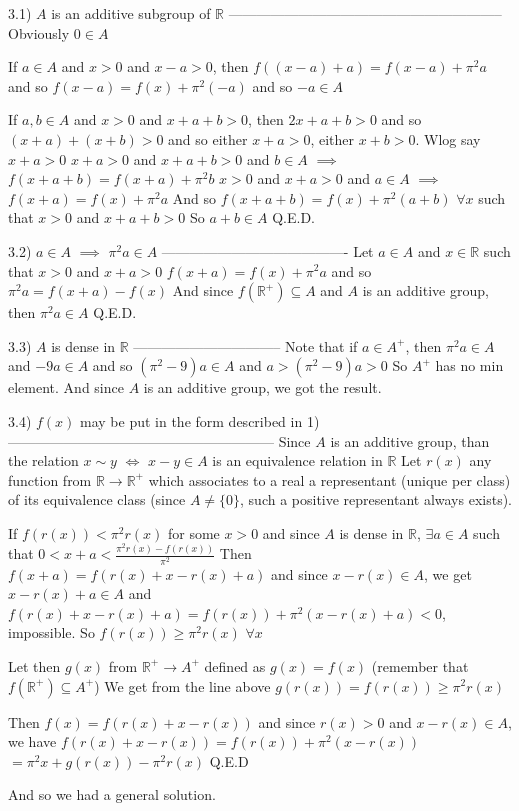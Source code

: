 \begin{solution}
3.1) $A$ is an additive subgroup of $\mathbb R$
-----------------------------------------------------------
Obviously $0\in A$

If $a\in A$ and $x>0$ and $x-a>0$, then $f((x-a)+a)=f(x-a)+\pi^2a$ and so $f(x-a)=f(x)+\pi^2(-a)$ and so $-a\in A$

If $a,b\in A$ and $x>0$ and $x+a+b>0$, then $2x+a+b>0$ and so $(x+a)+(x+b)>0$ and so either $x+a>0$, either $x+b>0$. Wlog say $x+a>0$
$x+a>0$ and $x+a+b>0$ and $b\in A$ $\implies$ $f(x+a+b)=f(x+a)+\pi^2b$
$x>0$ and $x+a>0$ and $a\in A$ $\implies$ $f(x+a)=f(x)+\pi^2a$
And so $f(x+a+b)=f(x)+\pi^2(a+b)$ $\forall x$ such that $x>0$ and $x+a+b>0$
So $a+b\in A$
Q.E.D.

3.2) $a\in A$ $\implies$ $\pi^2a\in A$
----------------------------------------
Let $a\in A$ and $x\in\mathbb R$ such that $x>0$ and $x+a>0$
$f(x+a)=f(x)+\pi^2a$ and so $\pi^2a=f(x+a)-f(x)$
And since $f(\mathbb R^+)\subseteq A$ and $A$ is an additive group, then  $\pi^2a\in A$
Q.E.D.

3.3) $A$ is dense in $\mathbb R$
--------------------------------
Note that if $a\in A^+$, then $\pi^2a\in A$ and $-9a\in A$ and so $(\pi^2-9)a\in A$ and $a>(\pi^2-9)a>0$
So $A^+$ has no min element.
And since $A$ is an additive group, we got the result.

3.4) $f(x)$ may be put in the form described in 1)
---------------------------------------------------------
Since $A$ is an additive group, than the relation $x\sim y$ $\iff$ $x-y\in A$ is an equivalence relation in $\mathbb R$
Let $r(x)$ any function from $\mathbb R\to\mathbb R^+$ which associates to a real a representant (unique per class) of its equivalence class (since $A\ne\{0\}$, such a positive representant always exists).

If $f(r(x))<\pi^2r(x)$ for some $x>0$ and since $A$ is dense in $\mathbb R$, $\exists a\in A$ such that $0<x+a<\frac{\pi^2r(x)-f(r(x))}{\pi^2}$
Then $f(x+a)=f(r(x)+x-r(x)+a)$ and since $x-r(x)\in A$, we get $x-r(x)+a\in A$ and $f(r(x)+x-r(x)+a)=f(r(x))+\pi^2(x-r(x)+a)<0$, impossible.
So $f(r(x))\ge \pi^2r(x)$ $\forall x$

Let then $g(x)$ from $\mathbb R^+\to A^+$ defined as $g(x)=f(x)$ (remember that $f(\mathbb R^+)\subseteq A^+$)
We get from the line above $g(r(x))=f(r(x))\ge \pi^2r(x)$

Then $f(x)=f(r(x)+x-r(x))$ and since $r(x)>0$ and $x-r(x)\in A$, we have $f(r(x)+x-r(x))=f(r(x))+\pi^2(x-r(x))$ ${=\pi^2x+g(r(x))-\pi^2r(x)}$
Q.E.D

And so we had a general solution.


\end{solution}
